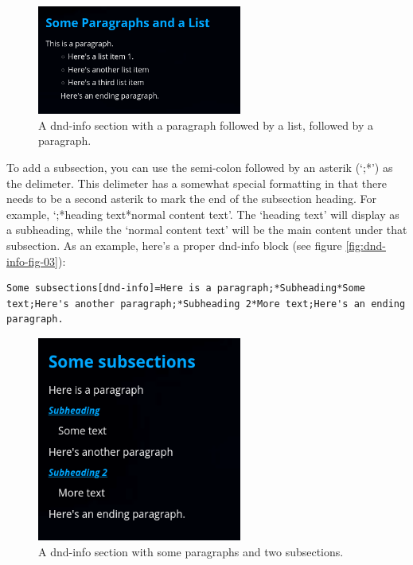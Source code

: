 \begin{figure}[h]
	\centering
	\includegraphics[width=0.6\textwidth]{images/dnd-info-section-02.png}
	\caption{A dnd-info section with a paragraph followed by a list, followed by a paragraph.}
	\label{fig:dnd-info-fig-2}
\end{figure}

To add a subsection, you can use the semi-colon followed by an asterik (`;*') as the delimeter. This delimeter has a somewhat special formatting in that there needs to be a second asterik to mark the end of the subsection heading. For example, `;*heading text*normal content text'. The `heading text' will display as a subheading, while the `normal content text' will be the main content under that subsection. As an example, here's a proper dnd-info block (see figure \ref{fig:dnd-info-fig-03}):

\begin{lstlisting}
Some subsections[dnd-info]=Here is a paragraph;*Subheading*Some text;Here's another paragraph;*Subheading 2*More text;Here's an ending paragraph.
\end{lstlisting}

\begin{figure}[h]
	\centering
	\includegraphics[width=0.6\textwidth]{images/dnd-info-section-03.png}
	\caption{A dnd-info section with some paragraphs and two subsections.}
	\label{fig:dnd-info-fig-3}
\end{figure}

